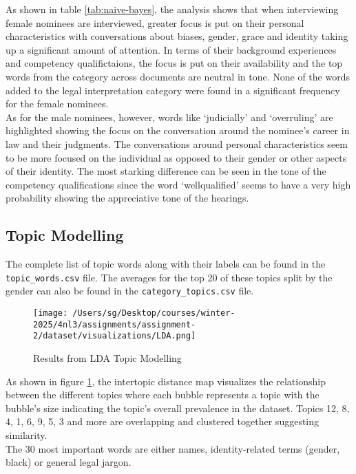 \documentclass[titlepage]{article}
\begin{document}
As shown in table \ref{tab:naive-bayes}, the analysis shows that when interviewing female nominees are interviewed, greater focus 
is put on their personal characteristics with conversations about biases, gender, grace and identity taking up a significant amount 
of attention. In terms of their background experiences and competency qualifictaions, the focus is put on their availability and 
the top words from the category across documents are neutral in tone. None of the words added to the legal interpretation category 
were found in a significant frequency for the female nominees. \\

As for the male nominees, however, words like `judicially' and `overruling' are highlighted showing the focus on the conversation around 
the nominee's career in law and their judgments. The conversations around personal characteristics seem to be more focused on the 
individual as opposed to their gender or other aspects of their identity. The most starking difference can be seen in the tone of 
the competency qualifications since the word `wellqualified' seems to have a very high probability showing the appreciative tone 
of the hearings.

\subsection{Topic Modelling}

The complete list of topic words along with their labels can be found in the \texttt{topic\_words.csv} file. The averages for the top 
20 of these topics split by the gender can also be found in the \texttt{category\_topics.csv} file. 

\begin{figure}[H]\label{fig:LDA}
    \centering
    \texttt{[image: /Users/sg/Desktop/courses/winter-2025/4nl3/assignments/assignment-2/dataset/visualizations/LDA.png]}
    \caption{Results from LDA Topic Modelling}
\end{figure}

As shown in figure \ref{fig:LDA}, the intertopic distance map visualizes the relationship between the different topics where each bubble represents 
a topic with the bubble's size indicating the topic's overall prevalence in the dataset. Topics 12, 8, 4, 1, 6, 9, 5, 3 and more are overlapping and 
clustered together suggesting similarity. \\

The 30 most important words are either names, identity-related terms (gender, black) or general legal jargon. 
\end{document}
